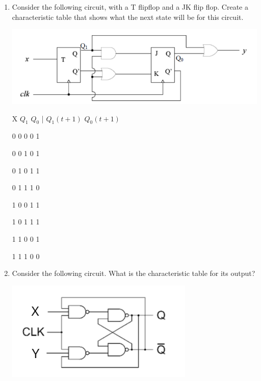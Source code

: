 \documentclass[10pt]{article}
\begin{document}
\begin{itemize}
\begin{enumerate}
\item Consider the following circuit, with a T flipflop and a JK flip flop.  Create a characteristic table that shows what the next state will be for this circuit. 

\includegraphics[scale=.8]{ExampleFFProblem.png}

X $Q_1$  $Q_0$ | $Q_1(t+1)$  $Q_0(t+1)$

0      0         0   \hspace{2cm}          0                1

0      0         1      \hspace{2cm}       0                1

0      1         0       \hspace{2cm}      1                1

0      1         1        \hspace{2cm}     1                0

1      0         0    \hspace{2cm}         1                1

1      0         1     \hspace{2cm}        1                1

1      1         0      \hspace{2cm}       0                1

1      1         1      \hspace{2cm}       0                0

\item Consider the following circuit.  What is the characteristic table for its output?

\includegraphics[scale=.8]{FlipFlopBehaviourProblemWithLabels.png}


\end{enumerate}
\end{itemize}
\end{document}
